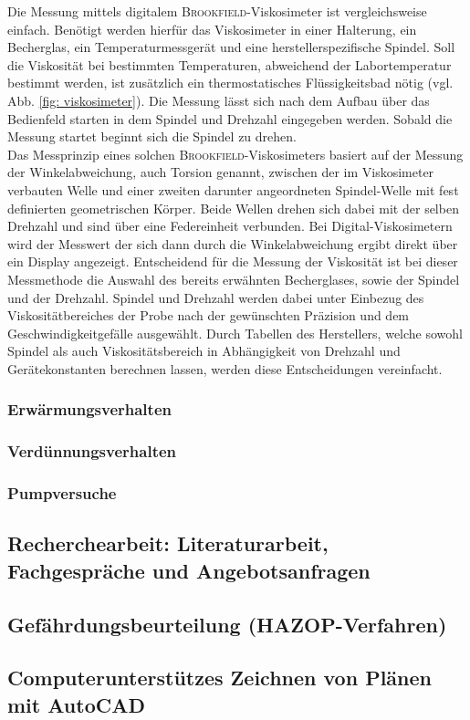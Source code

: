 Die Messung mittels digitalem \textsc{Brookfield}-Viskosimeter ist vergleichsweise einfach. Benötigt werden hierfür das Viskosimeter in einer Halterung, ein Becherglas, ein Temperaturmessgerät und eine herstellerspezifische Spindel. Soll die Viskosität bei bestimmten Temperaturen, abweichend der Labortemperatur bestimmt werden, ist zusätzlich ein thermostatisches Flüssigkeitsbad nötig (vgl. Abb. \ref{fig: viskosimeter}). Die Messung lässt sich nach dem Aufbau über das Bedienfeld starten in dem Spindel und Drehzahl eingegeben werden. Sobald die Messung startet beginnt sich die Spindel zu drehen.\\
Das Messprinzip eines solchen \textsc{Brookfield}-Viskosimeters basiert auf der Messung der Winkelabweichung, auch Torsion genannt, zwischen der im Viskosimeter verbauten Welle und einer zweiten darunter angeordneten Spindel-Welle mit fest definierten geometrischen Körper. Beide Wellen drehen sich dabei mit der selben Drehzahl  und sind über eine Federeinheit verbunden. Bei Digital-Viskosimetern wird der Messwert der sich dann durch die Winkelabweichung ergibt direkt über ein Display angezeigt.\linebreak
Entscheidend für die Messung der Viskosität ist bei dieser Messmethode die Auswahl des bereits erwähnten Becherglases, sowie der Spindel und der Drehzahl. Spindel und Drehzahl werden dabei unter Einbezug des Viskositätbereiches der Probe nach der gewünschten Präzision und dem Geschwindigkeitgefälle ausgewählt. \cite{DINDeutschesInstitutfurNormunge.V..September2018} 
Durch Tabellen des Herstellers, welche sowohl Spindel als auch Viskositätsbereich in Abhängigkeit von Drehzahl und Gerätekonstanten berechnen lassen, werden diese Entscheidungen vereinfacht. \cite{brookfield_31.01.2022} 

\subsubsection{Erwärmungsverhalten}
\subsubsection{Verdünnungsverhalten}
\subsubsection{Pumpversuche}

\subsection{Recherchearbeit: Literaturarbeit, Fachgespräche und Angebotsanfragen}

\subsection{Gefährdungsbeurteilung (HAZOP-Verfahren)}

\subsection{Computerunterstützes Zeichnen von Plänen mit AutoCAD}




